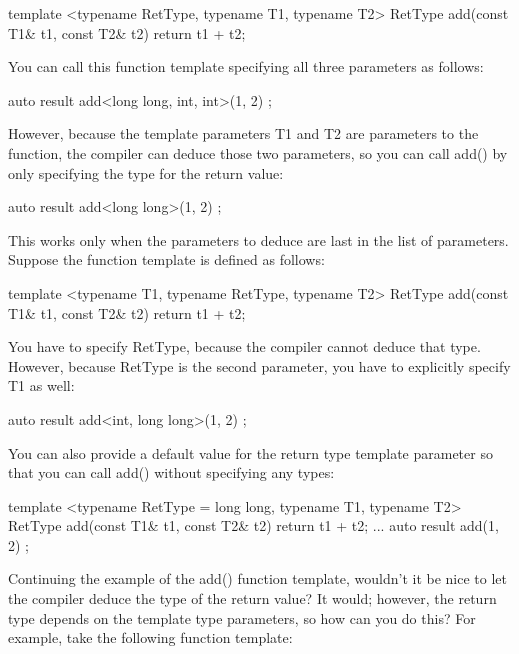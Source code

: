 \begin{cpp}
template <typename RetType, typename T1, typename T2>
RetType add(const T1& t1, const T2& t2) { return t1 + t2; }
\end{cpp}

You can call this function template specifying all three parameters as follows:

\begin{cpp}
auto result { add<long long, int, int>(1, 2) };
\end{cpp}

However, because the template parameters T1 and T2 are parameters to the function, the compiler can deduce those two parameters, so you can call add() by only specifying the type for the return value:

\begin{cpp}
auto result { add<long long>(1, 2) };
\end{cpp}

This works only when the parameters to deduce are last in the list of parameters. Suppose the function template is defined as follows:

\begin{cpp}
template <typename T1, typename RetType, typename T2>
RetType add(const T1& t1, const T2& t2) { return t1 + t2; }
\end{cpp}

You have to specify RetType, because the compiler cannot deduce that type. However, because RetType is the second parameter, you have to explicitly specify T1 as well:

\begin{cpp}
auto result { add<int, long long>(1, 2) };
\end{cpp}

You can also provide a default value for the return type template parameter so that you can call add() without specifying any types:

\begin{cpp}
template <typename RetType = long long, typename T1, typename T2>
RetType add(const T1& t1, const T2& t2) { return t1 + t2; }
...
auto result { add(1, 2) };
\end{cpp}


Continuing the example of the add() function template, wouldn’t it be nice to let the compiler deduce the type of the return value? It would; however, the return type depends on the template type parameters, so how can you do this? For example, take the following function template:

